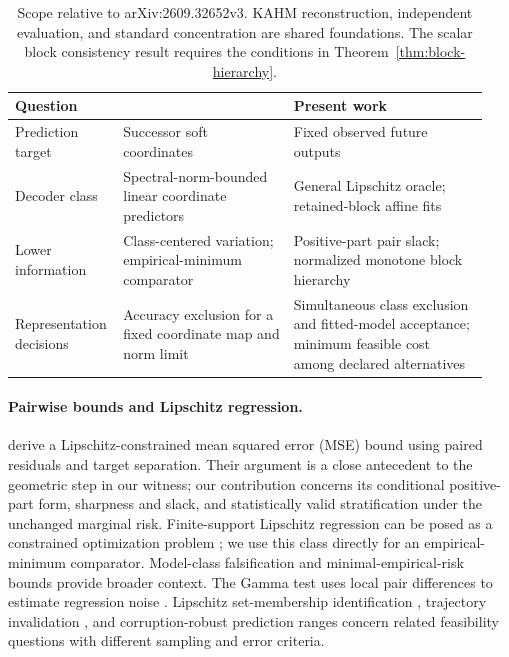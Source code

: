 \begin{table}[t]
\centering\small
\begin{tabular}{@{}p{0.19\linewidth}p{0.35\linewidth}p{0.40\linewidth}@{}}
\toprule
Question & \citet{kumar2026limits} & Present work \\
\midrule
Prediction target & Successor soft coordinates & Fixed observed future outputs \\
Decoder class & Spectral-norm-bounded linear coordinate predictors & General Lipschitz oracle; retained-block affine fits \\
Lower information & Class-centered variation; empirical-minimum comparator & Positive-part pair slack; normalized monotone block hierarchy \\
Representation decisions & Accuracy exclusion for a fixed coordinate map and norm limit & Simultaneous class exclusion and fitted-model acceptance; minimum feasible cost among declared alternatives \\
\bottomrule
\end{tabular}
\caption{Scope relative to arXiv:2609.32652v3. KAHM reconstruction,
independent evaluation, and standard concentration are shared foundations.
The scalar block consistency result requires the conditions in
Theorem~\ref{thm:block-hierarchy}.}
\label{tab:prior-comparison}
\end{table}

\paragraph{Pairwise bounds and Lipschitz regression.}
\citet{akash2021inverse} derive a Lipschitz-constrained mean squared error (MSE) bound
using paired residuals and target separation. Their argument is a close
antecedent to the geometric step in our witness; our contribution concerns
its conditional positive-part form, sharpness and slack, and statistically
valid stratification under the unchanged marginal risk. Finite-support
Lipschitz regression can be posed as a constrained optimization problem
\citep{gottlieb2017regression}; we use this class directly for an empirical-minimum
comparator. Model-class falsification \citep{muller2025falsification} and
minimal-empirical-risk bounds \citep{wu2026minimal} provide broader context.
The Gamma test uses local pair differences to estimate regression noise
\citep{evans2002gamma}. Lipschitz set-membership identification
\citep{milanese2004setmembership}, trajectory invalidation
\citep{jin2020invalidation}, and corruption-robust prediction ranges
\citep{blum2026reliable} concern related feasibility questions with different
sampling and error criteria.

